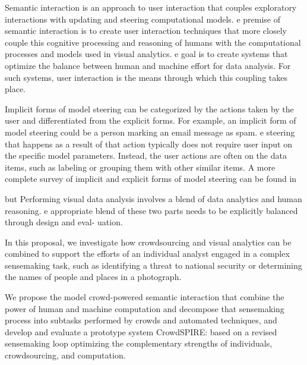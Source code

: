 \documentclass[journal]{vgtc}                %
\begin{document}
Semantic interaction is an approach to user interaction that couples exploratory interactions with updating and steering computational models. e premise of semantic interaction is to create user interaction techniques that more closely couple this cognitive processing and reasoning of humans with the computational processes and models used in visual analytics. e goal is to create systems that optimize the balance between human and machine eﬀort for data analysis. For such systems, user interaction is the means through which this coupling takes place.

Implicit forms of model steering can be categorized by the actions taken by the user and differentiated from the explicit forms. For example, an implicit form of model steering could be a person marking an email message as spam. e steering that happens as a result of that action typically does not require user input on the specific model parameters. Instead, the user actions are often on the data items, such as labeling or grouping them with other similar items. A more complete survey of implicit and explicit forms of model steering can be found in

but Performing visual data analysis involves a blend of data analytics and human reasoning. e appropriate blend of these two parts needs to be explicitly balanced through design and eval- uation.


In this proposal, we investigate how crowdsourcing and visual analytics can be combined to support the efforts of an individual analyst engaged in a complex sensemaking task, such as identifying a threat to national security or determining the names of people and places in a photograph.

We propose the model crowd-powered semantic interaction  that combine the power of human and machine computation and decompose that sensemaking process into subtasks performed by crowds and automated techniques, and develop and evaluate a prototype system CrowdSPIRE: based on a revised sensemaking loop optimizing the complementary strengths of individuals, crowdsourcing, and computation.
\end{document}
